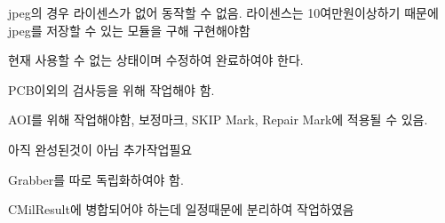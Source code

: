 
\begin{DoxyRefList}
\item[멤버 \mbox{\hyperlink{class_c_mil_buffer_ac071911bf5034976c9911ee4caf8ebe9}{CMil\+Buffer\+::Export}} (CString str\+File\+Name, int m\+\_\+i\+File\+Format=M\+\_\+\+TIFF)]\label{todo__todo000003}%
%
jpeg의 경우 라이센스가 없어 동작할 수 없음. 라이센스는 10여만원이상하기 때문에 jpeg를 저장할 수 있는 모듈을 구해 구현해야함  
\item[멤버 \mbox{\hyperlink{class_c_mil_buffer_aeb5cfce16fcce8907f01174b927fdf02}{CMil\+Buffer\+::Get\+Mil\+Counter}} (void)]\label{todo__todo000002}%
%
현재 사용할 수 없는 상태이며 수정하여 완료하여야 한다.  
\item[클래스 \mbox{\hyperlink{class_c_mil_edge_finder}{CMil\+Edge\+Finder}} ]\label{todo__todo000004}%
%
PCB이외의 검사등을 위해 작업해야 함.  
\item[클래스 \mbox{\hyperlink{class_c_mil_pat}{CMil\+Pat}} ]\label{todo__todo000006}%
%
AOI를 위해 작업해야함, 보정마크, SKIP Mark, Repair Mark에 적용될 수 있음.  
\item[클래스 \mbox{\hyperlink{class_c_mil_result}{CMil\+Result}} ]\label{todo__todo000007}%
%
아직 완성된것이 아님 추가작업필요  
\item[page \mbox{\hyperlink{index}{Matrox Project}} ]\label{todo__todo000001}%
%
Grabber를 따로 독립화하여야 함.  
\item[클래스 \mbox{\hyperlink{structt_mod_result}{t\+Mod\+Result}} ]\label{todo__todo000005}%
%
CMil\+Result에 병합되어야 하는데 일정때문에 분리하여 작업하였음 
\end{DoxyRefList}